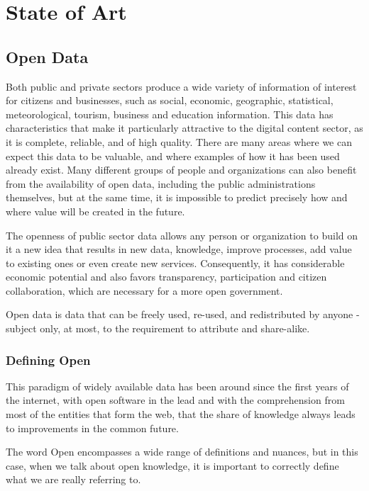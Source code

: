 \chapter{State of Art}
\label{chapter:StateOfArt}

\section{Open Data}
\label{section:OpenData}

Both public and private sectors produce a wide variety of information of interest for citizens and businesses, such as social, economic, geographic, statistical, meteorological, tourism, business and education information. This data has characteristics that make it particularly attractive to the digital content sector, as it is complete, reliable, and of high quality. There are many areas where we can expect this data to be valuable, and where examples of how it has been used already exist. Many different groups of people and organizations can also benefit from the availability of open data, including the public administrations themselves, but at the same time, it is impossible to predict precisely how and where value will be created in the future.

The openness of public sector data allows any person or organization to build on it a new idea that results in new data, knowledge, improve processes, add value to existing ones or even create new services. Consequently, it has considerable economic potential and also favors transparency, participation and citizen collaboration, which are necessary for a more open government.

Open data is data that can be freely used, re-used, and redistributed by anyone - subject only, at most, to the requirement to attribute and share-alike\cite{OpenDataHandbook}.

\subsection{Defining Open}

This paradigm of widely available data has been around since the first years of the internet, with open software in the lead and with the comprehension from most of the entities that form the web, that the share of knowledge always leads to improvements in the common future.

The word Open encompasses a wide range of definitions and nuances, but in this case, when we talk about open knowledge, it is important to correctly define what we are really referring to.

